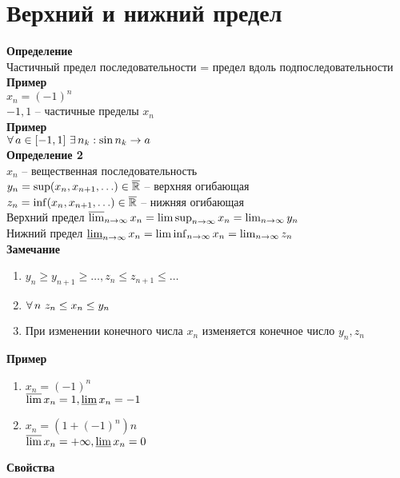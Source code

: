 \documentclass[12pt]{article}
\begin{document}
\section{Верхний и нижний предел}
\textbf{Определение}\\
Частичный предел последовательности = предел вдоль подпоследовательности\\
\textbf{Пример}\\
$x_n = (-1)^n$\\
$-1, 1$ -- частичные пределы $x_n$\\
\textbf{Пример}\\
$\forall\, a \in [-1, 1]\ \exists\, n_k: \sin n_k \rightarrow a$\\
\textbf{Определение 2}\\
$x_n$ -- вещественная последовательность\\
$y_n = \sup (x_n, x_{n+1}, \ldots) \in \overline{\mathbb{R}}$ -- верхняя огибающая\\
$z_n = \inf (x_n, x_{n+1}, \ldots) \in \overline{\mathbb{R}}$ -- нижняя огибающая\\
Верхний предел $\operatorname*{\overline{lim}}_{n\rightarrow \infty} x_n = \limsup_{n\rightarrow \infty} x_n = \lim_{n\rightarrow \infty} y_n$\\
Нижний предел $\operatorname*{\underline{lim}}_{n\rightarrow \infty} x_n = \liminf_{n\rightarrow \infty} x_n = \lim_{n\rightarrow \infty} z_n$\\
\textbf{Замечание}
\begin{enumerate}
    \item $y_n \geq y_{n+1} \geq \ldots, z_n \leq z_{n+1} \leq \ldots$
    \item $\forall\, n\ z_n \leq x_n \leq y_n$
    \item При изменении конечного числа $x_n$ изменяется конечное число $y_n, z_n$
\end{enumerate}
\textbf{Пример}
\begin{enumerate}
    \item $x_n = (-1)^n$\\
    $\operatorname*{\overline{lim}} x_n = 1, \operatorname*{\underline{lim}} x_n = -1$
    \item $x_n = (1+(-1)^n)n$\\
    $\operatorname*{\overline{lim}} x_n = +\infty, \operatorname*{\underline{lim}} x_n = 0$
\end{enumerate}
\textbf{Свойства}
\end{document}
